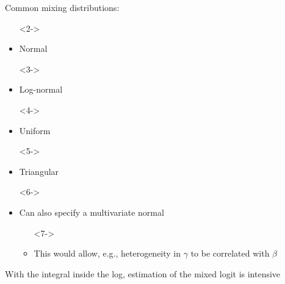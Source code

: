 \documentclass[aspectratio=169]{beamer}
\begin{document}
\begin{frame}

Common mixing distributions:
\begin{itemize}
    \item[]<2->
    \item<2-> Normal
    \item[]<3->
    \item<3-> Log-normal
    \item[]<4->
    \item<4-> Uniform
    \item[]<5->
    \item<5-> Triangular
    \item[]<6->
    \item<6-> Can also specify a multivariate normal
    \begin{itemize}
        \item[]<7->
        \item<7-> This would allow, e.g., heterogeneity in $\gamma$ to be correlated with $\beta$
    \end{itemize}
\end{itemize}


\end{frame}

\begin{frame}

With the integral inside the log, estimation of the mixed logit is intensive

\bigskip{}


\bigskip{}


\bigskip{}



\bigskip{}


\end{frame}
\end{document}
